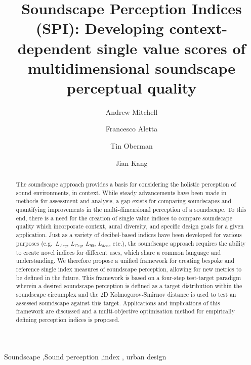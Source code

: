 \documentclass[
  authoryear,
  preprint,
  1p]{elsarticle}
\begin{document}
\begin{frontmatter}
\title{Soundscape Perception Indices (SPI): Developing context-dependent
single value scores of multidimensional soundscape perceptual quality}
\author[1,2]{Andrew Mitchell%
%
}
\author[2]{Francesco Aletta%
%
}
\author[2]{Tin Oberman%
%
}
\author[2]{Jian Kang%
%
}






        
\begin{abstract}
The soundscape approach provides a basis for considering the holistic
perception of sound environments, in context. While steady advancements
have been made in methods for assessment and analysis, a gap exists for
comparing soundscapes and quantifying improvements in the
multi-dimensional perception of a soundscape. To this end, there is a
need for the creation of single value indices to compare soundscape
quality which incorporate context, aural diversity, and specific design
goals for a given application. Just as a variety of decibel-based
indices have been developed for various purposes (e.g.~\(L_{Aeq}\),
\(L_{Ceq}\), \(L_{90}\), \(L_{den}\), etc.), the soundscape approach
requires the ability to create novel indices for different uses, which
share a common language and understanding. We therefore propose a
unified framework for creating bespoke and reference single index
measures of soundscape perception, allowing for new metrics to be
defined in the future. This framework is based on a four-step
test-target paradigm wherein a desired soundscape perception is defined
as a target distribution within the soundscape circumplex and the 2D
Kolmogorov-Smirnov distance is used to test an assessed soundscape
against this target. Applications and implications of this framework are
discussed and a multi-objective optimisation method for empirically
defining perception indices is proposed.
\end{abstract}





\begin{keyword}
    Soundscape \sep Sound perception \sep index \sep 
    urban design
\end{keyword}
\end{frontmatter}
    
\end{document}
